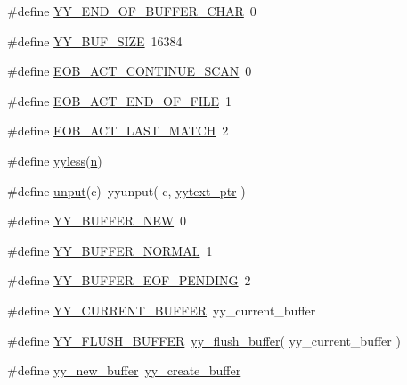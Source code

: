 \begin{DoxyCompactItemize}
\item 
\#define \mbox{\hyperlink{expr-lex_8cpp_ab866a64da164ed2d4d444df1ef1fc9b3}{Y\+Y\+\_\+\+E\+N\+D\+\_\+\+O\+F\+\_\+\+B\+U\+F\+F\+E\+R\+\_\+\+C\+H\+AR}}~0
\item 
\#define \mbox{\hyperlink{expr-lex_8cpp_ae7e51116e747d3390e7a6cfc6532834c}{Y\+Y\+\_\+\+B\+U\+F\+\_\+\+S\+I\+ZE}}~16384
\item 
\#define \mbox{\hyperlink{expr-lex_8cpp_adf4b0db227e07782e28ade353a7ba7a1}{E\+O\+B\+\_\+\+A\+C\+T\+\_\+\+C\+O\+N\+T\+I\+N\+U\+E\+\_\+\+S\+C\+AN}}~0
\item 
\#define \mbox{\hyperlink{expr-lex_8cpp_a7f71d7fa2c403eb4b2f38cb9536f3c63}{E\+O\+B\+\_\+\+A\+C\+T\+\_\+\+E\+N\+D\+\_\+\+O\+F\+\_\+\+F\+I\+LE}}~1
\item 
\#define \mbox{\hyperlink{expr-lex_8cpp_ad1a0b5ebcabffe388e9e9ebb2619c1fb}{E\+O\+B\+\_\+\+A\+C\+T\+\_\+\+L\+A\+S\+T\+\_\+\+M\+A\+T\+CH}}~2
\item 
\#define \mbox{\hyperlink{expr-lex_8cpp_ae65cb72d09db0abdc4b8e8c4d533ab14}{yyless}}(\mbox{\hyperlink{expr-lex_8cpp_aeab71244afb687f16d8c4f5ee9d6ef0e}{n}})
\item 
\#define \mbox{\hyperlink{expr-lex_8cpp_a448a4e9041a09588332733c6846c770c}{unput}}(c)~yyunput( c, \mbox{\hyperlink{expr-lex_8cpp_ad6fabaea416e87b0f79fc34741e70818}{yytext\+\_\+ptr}} )
\item 
\#define \mbox{\hyperlink{expr-lex_8cpp_a53579db42834b88199458993912c646d}{Y\+Y\+\_\+\+B\+U\+F\+F\+E\+R\+\_\+\+N\+EW}}~0
\item 
\#define \mbox{\hyperlink{expr-lex_8cpp_a609d19f40900ecc2a5f812d9388c21fb}{Y\+Y\+\_\+\+B\+U\+F\+F\+E\+R\+\_\+\+N\+O\+R\+M\+AL}}~1
\item 
\#define \mbox{\hyperlink{expr-lex_8cpp_ad689d97c15e807a6116ace7a420cea57}{Y\+Y\+\_\+\+B\+U\+F\+F\+E\+R\+\_\+\+E\+O\+F\+\_\+\+P\+E\+N\+D\+I\+NG}}~2
\item 
\#define \mbox{\hyperlink{expr-lex_8cpp_aa093d500a6330d06d8e4760c494fac33}{Y\+Y\+\_\+\+C\+U\+R\+R\+E\+N\+T\+\_\+\+B\+U\+F\+F\+ER}}~yy\+\_\+current\+\_\+buffer
\item 
\#define \mbox{\hyperlink{expr-lex_8cpp_ac5d478d90ea9a2ecd43d579067a2e89d}{Y\+Y\+\_\+\+F\+L\+U\+S\+H\+\_\+\+B\+U\+F\+F\+ER}}~\mbox{\hyperlink{expr-lex_8cpp_aaad521488306a55a775adfe38ce4cf49}{yy\+\_\+flush\+\_\+buffer}}( yy\+\_\+current\+\_\+buffer )
\item 
\#define \mbox{\hyperlink{expr-lex_8cpp_ab7eb911e18655f2f78e63afe5a8a4a12}{yy\+\_\+new\+\_\+buffer}}~\mbox{\hyperlink{expr-lex_8cpp_a55588ac24161be2160e907e019dcae5c}{yy\+\_\+create\+\_\+buffer}}

\end{DoxyCompactItemize}
